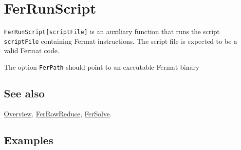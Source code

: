 \documentclass[../FeynHelpersManual.tex]{subfiles}
\begin{document}
\hypertarget{ferrunscript}{
\section{FerRunScript}\label{ferrunscript}}

\texttt{FerRunScript[\allowbreak{}scriptFile]} is an auxiliary function
that runs the script \texttt{scriptFile} containing Fermat instructions.
The script file is expected to be a valid Fermat code.

The option \texttt{FerPath} should point to an executable Fermat binary

\subsection{See also}

\hyperlink{toc}{Overview}, \hyperlink{ferrowreduce}{FerRowReduce},
\hyperlink{fersolve}{FerSolve}.

\subsection{Examples}
\end{document}
